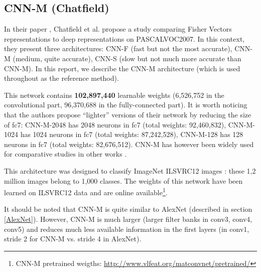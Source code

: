 \subsection{CNN-M (Chatfield)}

In their paper \cite{Chatfield14}, Chatfield et al. propose a study comparing Fisher Vectors representations to deep representations on 
PASCALVOC2007. In this context, they present three architectures: CNN-F (fast but not the most accurate), CNN-M (medium, quite accurate), CNN-S 
(slow but not much more accurate than CNN-M). In this report, we describe the CNN-M architecture (which is used throughout \cite{Chatfield14} as 
the reference method). 

This network contains \textbf{102,897,440} learnable weights (6,526,752 in the convolutional part, 96,370,688 in the fully-connected part). It is 
worth noticing that the authors propose ``lighter'' versions of their network by reducing the size of fc7: CNN-M-2048 has 2048 neurons in fc7 (total 
weights: 92,460,832), CNN-M-1024 has 1024 neurons in fc7 (total weights: 87,242,528), CNN-M-128 has 128 neurons in fc7 (total weights: 82,676,512). 
CNN-M has however been widely used for comparative studies in other works \cite{}. 

This architecture was designed to classify ImageNet ILSVRC12 images \cite{Deng09ImageNet}: these 1,2 million images belong to 1,000 classes. 
The weights of this network have been learned on ILSVRC12 data and are online available\footnote{CNN-M pretrained weigths: 
\url{http://www.vlfeat.org/matconvnet/pretrained/}}.

It should be noted that CNN-M is quite similar to AlexNet (described in section \ref{AlexNet}). However, CNN-M is much larger (larger filter banks in 
conv3, conv4, conv5) and reduces much less available information in the first layers (in conv1, stride 2 for CNN-M vs. stride 4 in AlexNet).


